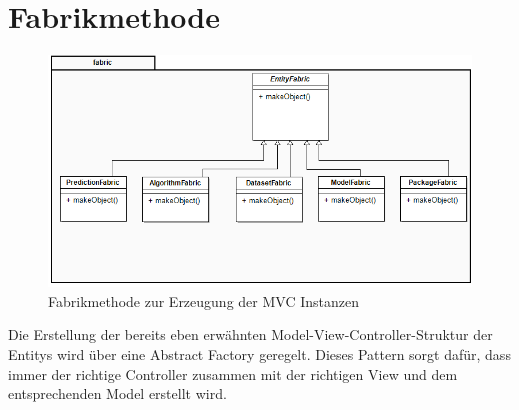 \section{Fabrikmethode}

\begin{figure}[h]
\centering
\includegraphics[width=0.6\linewidth]{Grafik/Klassendiagramme/fabrik.png}
\caption{Fabrikmethode zur Erzeugung der MVC Instanzen}
\end{figure}


Die Erstellung der bereits eben erwähnten Model-View-Controller-Struktur der Entitys wird über eine Abstract Factory geregelt. Dieses Pattern sorgt dafür, dass immer der richtige Controller zusammen mit der richtigen View und dem entsprechenden Model erstellt wird.

